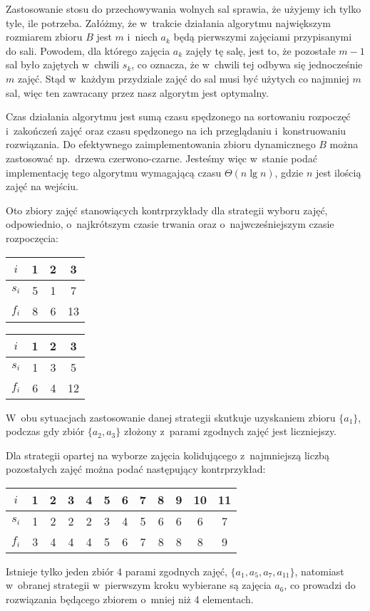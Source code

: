 Zastosowanie stosu do przechowywania wolnych sal sprawia, że użyjemy ich tylko tyle, ile potrzeba.
Załóżmy, że w~trakcie działania algorytmu największym rozmiarem zbioru $B$ jest $m$ i~niech $a_k$ będą pierwszymi zajęciami przypisanymi do  sali.
Powodem, dla którego zajęcia $a_k$ zajęły tę salę, jest to, że pozostałe $m-1$ sal było zajętych w~chwili $s_k$, co oznacza, że w~chwili tej odbywa się jednocześnie $m$ zajęć.
Stąd w~każdym przydziale zajęć do sal musi być użytych co najmniej $m$ sal, więc ten zawracany przez nasz algorytm jest optymalny.

Czas działania algorytmu jest sumą czasu spędzonego na sortowaniu rozpoczęć i~zakończeń zajęć oraz czasu spędzonego na ich przeglądaniu i~konstruowaniu rozwiązania.
Do efektywnego zaimplementowania zbioru dynamicznego $B$ można zastosować np.\ drzewa czerwono-czarne.
Jesteśmy więc w~stanie podać implementację tego algorytmu wymagającą czasu $\Theta(n\lg n)$, gdzie $n$ jest ilością zajęć na wejściu.

\exercise %
Oto zbiory zajęć stanowiących kontrprzykłady dla strategii wyboru zajęć, odpowiednio, o~najkrótszym czasie trwania oraz o~najwcześniejszym czasie rozpoczęcia:
\begin{center}
	\begin{tabular}{cccc}
		$i$ & 1 & 2 & 3 \\ \hline
		$s_i$ & 5 & 1 & 7 \\
		$f_i$ & 8 & 6 & 13
	\end{tabular}
	\hskip3cm
	\begin{tabular}{cccc}
		$i$ & 1 & 2 & 3 \\ \hline
		$s_i$ & 1 & 3 & 5 \\
		$f_i$ & 6 & 4 & 12
	\end{tabular}
\end{center}
W~obu sytuacjach zastosowanie danej strategii skutkuje uzyskaniem zbioru $\{a_1\}$, podczas gdy zbiór $\{a_2,a_3\}$ złożony z~parami zgodnych zajęć jest liczniejszy.

Dla strategii opartej na wyborze zajęcia kolidującego z~najmniejszą liczbą pozostałych zajęć można podać następujący kontrprzykład:
\begin{center}
	\begin{tabular}{cccccccccccc}
		$i$ & 1 & 2 & 3 & 4 & 5 & 6 & 7 & 8 & 9 & 10 & 11 \\ \hline
		$s_i$ & 1 & 2 & 2 & 2 & 3 & 4 & 5 & 6 & 6 & 6 & 7 \\
		$f_i$ & 3 & 4 & 4 & 4 & 5 & 6 & 7 & 8 & 8 & 8 & 9
	\end{tabular}
\end{center}
Istnieje tylko jeden zbiór 4 parami zgodnych zajęć, $\{a_1,a_5,a_7,a_{11}\}$, natomiast w~obranej strategii w~pierwszym kroku wybierane są zajęcia $a_6$, co prowadzi do rozwiązania będącego zbiorem o~mniej niż 4 elementach.
